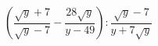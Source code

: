 \begin{ex}[type=expression]
	\begin{condition}
		\( \left( \dfrac{\sqrt{y}+7}{\sqrt{y}-7}-\dfrac{28\sqrt{y}}{y-49} \right):\dfrac{\sqrt{y}-7}{y+7\sqrt{y}} \)
	\end{condition}
\end{ex}